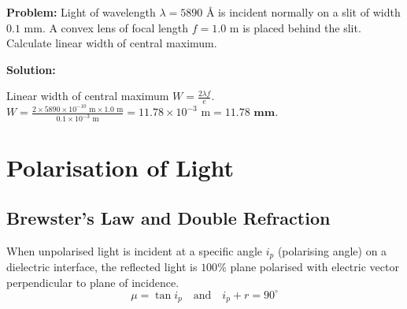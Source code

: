 \documentclass[12pt,a4paper]{article}
\begin{document}
\begin{tcolorbox}[examplebox, title={\textbf{Solved Problem 2: Single Slit Central Width}}]
\textbf{Problem:} Light of wavelength $\lambda = 5890\text{ \AA}$ is incident normally on a slit of width $0.1\text{ mm}$. A convex lens of focal length $f = 1.0\text{ m}$ is placed behind the slit. Calculate linear width of central maximum.

\textbf{Solution:}\par\noindent
Linear width of central maximum $W = \frac{2 \lambda f}{e}$.
$W = \frac{2 \times 5890 \times 10^{-10}\text{ m} \times 1.0\text{ m}}{0.1 \times 10^{-3}\text{ m}} = 11.78 \times 10^{-3}\text{ m} = \mathbf{11.78\text{ mm}}$.
\end{tcolorbox}

\section{Polarisation of Light}

\subsection{Brewster's Law and Double Refraction}

\begin{tcolorbox}[defbox, title={\textbf{Brewster's Law}}]
When unpolarised light is incident at a specific angle $i_p$ (polarising angle) on a dielectric interface, the reflected light is $100\%$ plane polarised with electric vector perpendicular to plane of incidence.
\begin{equation}
\mu = \tan i_p \quad \text{and} \quad i_p + r = 90^\circ
\end{equation}
\end{tcolorbox}
\end{document}
